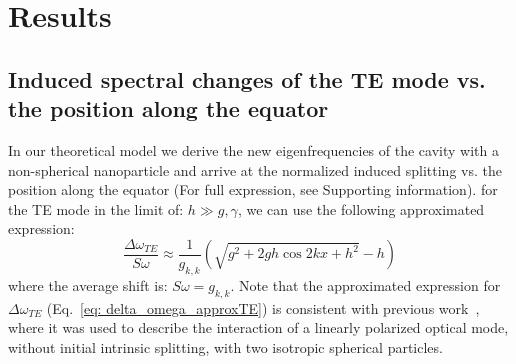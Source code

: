 \documentclass[journal=jacsat,manuscript=article]{achemso}
\begin{document}
\section{Results}

\subsection{Induced spectral changes of the TE mode vs. the position along the equator}

In our theoretical model we derive the new eigenfrequencies of the cavity with a non-spherical nanoparticle and arrive at the normalized induced splitting vs. the position along the equator (For full expression, see Supporting information). for the TE mode in the limit of: $h\gg g, \gamma$, we can use the following approximated expression:
\begin{equation}
\frac{\Delta \omega_{TE}}{S\omega}  \approx \frac{1}{g_{k,k}}(\sqrt{ g^2 + 2  g h \cos{2 k x}  + h^2}-h)
\label{eq: delta_omega_approxTE}
\end{equation}
where the average shift is: $\textit{S}\omega=g_{k,k}$.
Note that the approximated expression for $\Delta \omega_{TE} $ (Eq.~\ref{eq: delta_omega_approxTE}) is consistent with previous work~\cite{he2013statistics}, where it was used to describe the interaction of a linearly polarized optical mode, without initial intrinsic splitting, with two isotropic spherical particles.
\end{document}
